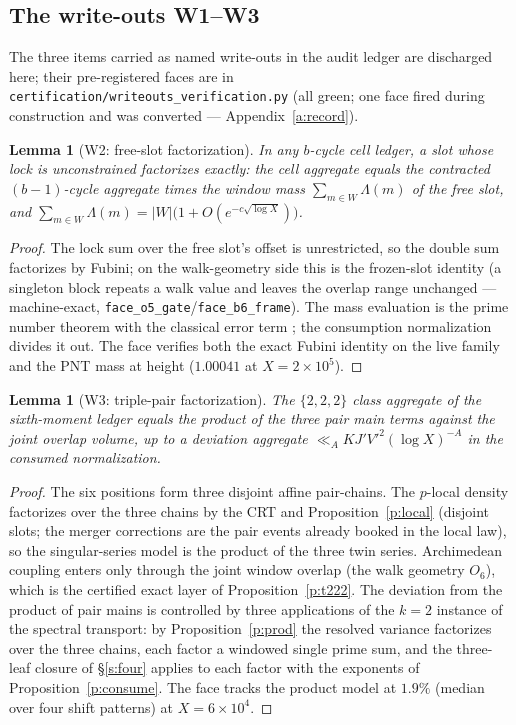 \documentclass[11pt]{article}
\numberwithin{equation}{section}
\newtheorem{lemma}[theorem]{Lemma}
\theoremstyle{definition}
\theoremstyle{remark}
\newcommand{\LL}{\Lambda}
\begin{document}
\subsection{The write-outs W1--W3}\label{s:writeouts}

The three items carried as named write-outs in the audit ledger
are discharged here; their pre-registered faces are in
\texttt{certification/writeouts\_verification.py} (all green;
one face fired during construction and was converted ---
Appendix~\ref{a:record}).

\begin{lemma}[W2: free-slot factorization]\label{l:W2}
In any $b$-cycle cell ledger, a slot whose lock is unconstrained
factorizes exactly: the cell aggregate equals the contracted
$(b-1)$-cycle aggregate times the window mass
$\sum_{m\in W}\LL(m)$ of the free slot, and
$\sum_{m\in W}\LL(m)=|W|\bigl(1+O(e^{-c\sqrt{\log X}})\bigr)$.
\end{lemma}

\begin{proof}
The lock sum over the free slot's offset is unrestricted, so the
double sum factorizes by Fubini; on the walk-geometry side this
is the frozen-slot identity (a singleton block repeats a walk
value and leaves the overlap range unchanged --- machine-exact,
\texttt{face\_o5\_gate}/\texttt{face\_b6\_frame}). The mass
evaluation is the prime number theorem with the classical error
term \cite[\S18]{Dav}; the consumption normalization divides it
out. The face verifies both the exact Fubini identity on the live
family and the PNT mass at height ($1.00041$ at $X=2\times
10^{5}$).
\end{proof}

\begin{lemma}[W3: triple-pair factorization]\label{l:W3}
The $\{2,2,2\}$ class aggregate of the sixth-moment ledger
equals the product of the three pair main terms against the joint
overlap volume, up to a deviation aggregate
$\ll_A KJ'V'^2(\log X)^{-A}$ in the consumed normalization.
\end{lemma}

\begin{proof}
The six positions form three disjoint affine pair-chains. The
$p$-local density factorizes over the three chains by the CRT and
Proposition~\ref{p:local} (disjoint slots; the merger
corrections are the pair events already booked in the local law), so the
singular-series model is the product of the three twin series.
Archimedean coupling enters only through the joint window overlap
(the walk geometry $O_6$), which is the certified exact layer of
Proposition~\ref{p:t222}. The deviation from the product of pair
mains is controlled by three applications of the $k=2$ instance
of the spectral transport: by Proposition~\ref{p:prod} the
resolved variance factorizes over the three chains, each factor a
windowed single prime sum, and the three-leaf closure of
\S\ref{s:four} applies to each factor with the exponents of
Proposition~\ref{p:consume}. The face tracks the product model at
$1.9\%$ (median over four shift patterns) at $X=6\times10^{4}$.
\end{proof}
\end{document}
